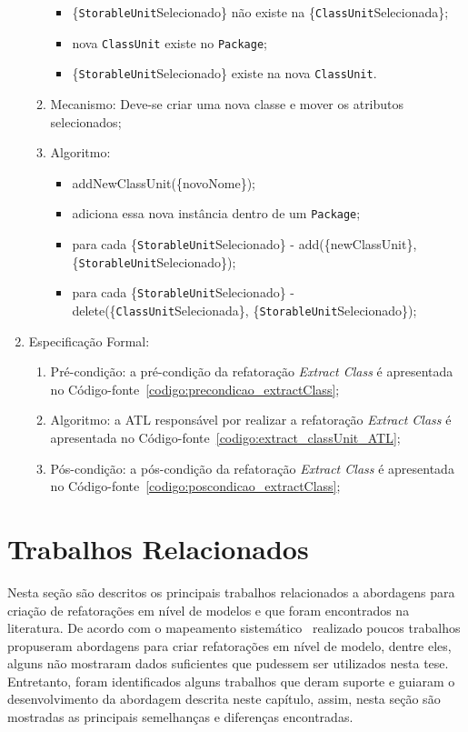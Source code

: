 \begin{enumerate}
\begin{enumerate}
\begin{itemize}
			        \item \{\texttt{StorableUnit}Selecionado\} não existe na \{\texttt{ClassUnit}Selecionada\};
			        \item nova \texttt{ClassUnit} existe no \texttt{Package};
			        \item \{\texttt{StorableUnit}Selecionado\} existe na nova \texttt{ClassUnit}.
			    \end{itemize}
			\item Mecanismo: Deve-se criar uma nova classe e mover os atributos selecionados;
			\item Algoritmo: 
			    \begin{itemize}
			        \item addNewClassUnit(\{novoNome\});
			        \item adiciona essa nova instância dentro de um \texttt{Package};
			        \item para cada \{\texttt{StorableUnit}Selecionado\} - add(\{newClassUnit\}, \{\texttt{StorableUnit}\-Selecionado\});
			        \item para cada \{\texttt{StorableUnit}Selecionado\} - delete(\{\texttt{ClassUnit}Selecionada\}, \{\texttt{Storable\-Unit}Selecionado\});
			    \end{itemize} 
	    \end{enumerate}
		\item Especificação Formal:
		\begin{enumerate}
			\item Pré-condição: a pré-condição da refatoração \textit{Extract Class} é apresentada no Código-fonte~\ref{codigo:precondicao_extractClass};
			\item Algoritmo: a ATL responsável por realizar a refatoração \textit{Extract Class} é apresentada no Código-fonte~\ref{codigo:extract_classUnit_ATL};
			\item Pós-condição: a pós-condição da refatoração \textit{Extract Class} é apresentada no Código-fonte~\ref{codigo:poscondicao_extractClass};
		\end{enumerate}
\end{enumerate}


\section{Trabalhos Relacionados}

Nesta seção são descritos os principais trabalhos relacionados a abordagens para criação de refatorações em nível de modelos e que foram encontrados na literatura. De acordo com o mapeamento sistemático~\cite{durelli_systematic_mapping} realizado poucos trabalhos propuseram abordagens para criar refatorações em nível de modelo, dentre eles, alguns não mostraram dados suficientes que pudessem ser utilizados nesta tese. Entretanto, foram identificados alguns trabalhos que deram suporte e guiaram o desenvolvimento da abordagem descrita neste capítulo, assim, nesta seção são mostradas as principais semelhanças e diferenças encontradas.

